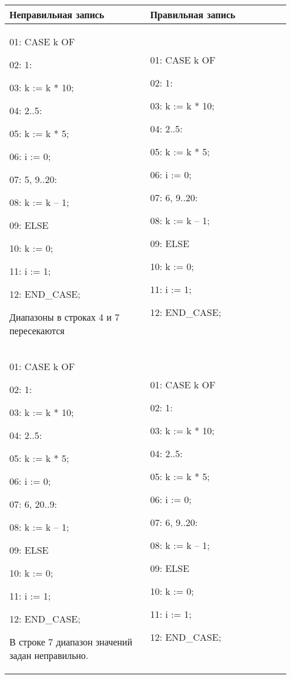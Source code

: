 \documentclass[letterpaper,10pt,russian]{sphinxmanual}
\begin{document}
\noindent\begin{tabular}{|p{0.475\linewidth}|p{0.475\linewidth}|}
\hline

Неправильная запись
&
Правильная запись
\\
\hline
01: CASE k OF

02: 1:

03: k := k * 10;

04: 2..5:

05: k := k * 5;

06: i := 0;

07: 5, 9..20:

08: k := k – 1;

09: ELSE

10: k := 0;

11: i := 1;

12: END\_CASE;

Диапазоны в строках 4 и 7 пересекаются
&
01: CASE k OF

02: 1:

03: k := k * 10;

04: 2..5:

05: k := k * 5;

06: i := 0;

07: 6, 9..20:

08: k := k – 1;

09: ELSE

10: k := 0;

11: i := 1;

12: END\_CASE;
\\
\hline
01: CASE k OF

02: 1:

03: k := k * 10;

04: 2..5:

05: k := k * 5;

06: i := 0;

07: 6, 20..9:

08: k := k – 1;

09: ELSE

10: k := 0;

11: i := 1;

12: END\_CASE;

В строке 7 диапазон значений задан неправильно.
&
01: CASE k OF

02: 1:

03: k := k * 10;

04: 2..5:

05: k := k * 5;

06: i := 0;

07: 6, 9..20:

08: k := k – 1;

09: ELSE

10: k := 0;

11: i := 1;

12: END\_CASE;
\\
\hline\end{tabular}
\end{document}
